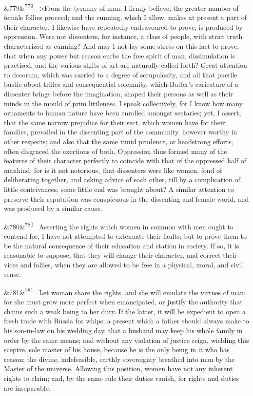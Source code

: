 \documentclass[12pt]{article}
\newcommand{\para}[1][]{\par\noindent\ifx&#1&\else\textsuperscript{\footnotesize #1}~\fi}
\begin{document}
\para[779] >From the tyranny of man, I firmly believe, the greater number of female follies proceed; and the cunning, which I allow, makes at present a part of their character, I likewise have repeatedly endeavoured to prove, is produced by oppression. Were not dissenters, for instance, a class of people, with strict truth characterized as cunning? And may I not lay some stress on this fact to prove, that when any power but reason curbs the free spirit of man, dissimulation is practised, and the various shifts of art are naturally called forth? Great attention to decorum, which was carried to a degree of scrupulosity, and all that puerile bustle about trifles and consequential solemnity, which Butler's caricature of a dissenter brings before the imagination, shaped their persons as well as their minds in the mould of prim littleness. I speak collectively, for I know how many ornaments to human nature have been enrolled amongst sectaries; yet, I assert, that the same narrow prejudice for their sect, which women have for their families, prevailed in the dissenting part of the community, however worthy in other respects; and also that the same timid prudence, or headstrong efforts, often disgraced the exertions of both. Oppression thus formed many of the features of their character perfectly to coincide with that of the oppressed half of mankind; for is it not notorious, that dissenters were like women, fond of deliberating together, and asking advice of each other, till by a complication of little contrivances, some little end was brought about? A similar attention to preserve their reputation was conspicuous in the dissenting and female world, and was produced by a similar cause.

\para[780] Asserting the rights which women in common with men ought to contend for, I have not attempted to extenuate their faults; but to prove them to be the natural consequence of their education and station in society. If so, it is reasonable to suppose, that they will change their character, and correct their vices and follies, when they are allowed to be free in a physical, moral, and civil sense.

\para[781] Let woman share the rights, and she will emulate the virtues of man; for she must grow more perfect when emancipated, or justify the authority that chains such a weak being to her duty. If the latter, it will be expedient to open a fresh trade with Russia for whips; a present which a father should always make to his son-in-law on his wedding day, that a husband may keep his whole family in order by the same means; and without any violation of justice reign, wielding this sceptre, sole master of his house, because he is the only being in it who has reason; the divine, indefeasible, earthly sovereignty breathed into man by the Master of the universe. Allowing this position, women have not any inherent rights to claim; and, by the same rule their duties vanish, for rights and duties are inseparable.

\end{document}
